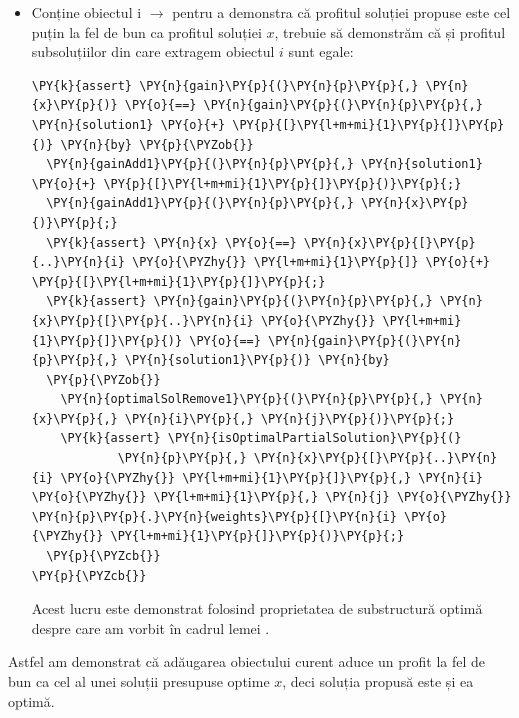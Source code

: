 \begin{sloppypar}
\begin{enumerate}
\begin{itemize}
\begin{Verbatim}[commandchars=\\\{\}]
\PY{n}{computeWeight}\PY{p}{(}\PY{n}{p}\PY{p}{,} \PY{n}{solution1} \PY{o}{+} \PY{p}{[}\PY{l+m+mi}{1}\PY{p}{]}\PY{p}{,} \PY{o}{|}\PY{n}{solution1} \PY{o}{+} \PY{p}{[}\PY{l+m+mi}{1}\PY{p}{]}\PY{o}{|} \PY{o}{\PYZhy{}} \PY{l+m+mi}{1}\PY{p}{)} \PY{o}{\PYZlt{}=} \PY{n}{j}
\end{Verbatim}
         că adăugând câștigul obiectului curent obținem un profit mai bun și nu depășim capacitatea $j$ ajungem la o contradicție, deci obiectul aparține soluției $x$.
         \item Conține obiectul i $\rightarrow$ pentru a demonstra că profitul soluției propuse este cel puțin la fel de bun ca profitul soluției $x$, trebuie să demonstrăm că și profitul subsoluțiilor din care extragem obiectul $i$ sunt egale:
         \begin{Verbatim}[commandchars=\\\{\}]
\PY{k}{assert} \PY{n}{gain}\PY{p}{(}\PY{n}{p}\PY{p}{,} \PY{n}{x}\PY{p}{)} \PY{o}{==} \PY{n}{gain}\PY{p}{(}\PY{n}{p}\PY{p}{,} \PY{n}{solution1} \PY{o}{+} \PY{p}{[}\PY{l+m+mi}{1}\PY{p}{]}\PY{p}{)} \PY{n}{by} \PY{p}{\PYZob{}} 
  \PY{n}{gainAdd1}\PY{p}{(}\PY{n}{p}\PY{p}{,} \PY{n}{solution1} \PY{o}{+} \PY{p}{[}\PY{l+m+mi}{1}\PY{p}{]}\PY{p}{)}\PY{p}{;}
  \PY{n}{gainAdd1}\PY{p}{(}\PY{n}{p}\PY{p}{,} \PY{n}{x}\PY{p}{)}\PY{p}{;}
  \PY{k}{assert} \PY{n}{x} \PY{o}{==} \PY{n}{x}\PY{p}{[}\PY{p}{..}\PY{n}{i} \PY{o}{\PYZhy{}} \PY{l+m+mi}{1}\PY{p}{]} \PY{o}{+} \PY{p}{[}\PY{l+m+mi}{1}\PY{p}{]}\PY{p}{;}
  \PY{k}{assert} \PY{n}{gain}\PY{p}{(}\PY{n}{p}\PY{p}{,} \PY{n}{x}\PY{p}{[}\PY{p}{..}\PY{n}{i} \PY{o}{\PYZhy{}} \PY{l+m+mi}{1}\PY{p}{]}\PY{p}{)} \PY{o}{==} \PY{n}{gain}\PY{p}{(}\PY{n}{p}\PY{p}{,} \PY{n}{solution1}\PY{p}{)} \PY{n}{by}
  \PY{p}{\PYZob{}}
    \PY{n}{optimalSolRemove1}\PY{p}{(}\PY{n}{p}\PY{p}{,} \PY{n}{x}\PY{p}{,} \PY{n}{i}\PY{p}{,} \PY{n}{j}\PY{p}{)}\PY{p}{;}
    \PY{k}{assert} \PY{n}{isOptimalPartialSolution}\PY{p}{(}
            \PY{n}{p}\PY{p}{,} \PY{n}{x}\PY{p}{[}\PY{p}{..}\PY{n}{i} \PY{o}{\PYZhy{}} \PY{l+m+mi}{1}\PY{p}{]}\PY{p}{,} \PY{n}{i} \PY{o}{\PYZhy{}} \PY{l+m+mi}{1}\PY{p}{,} \PY{n}{j} \PY{o}{\PYZhy{}} \PY{n}{p}\PY{p}{.}\PY{n}{weights}\PY{p}{[}\PY{n}{i} \PY{o}{\PYZhy{}} \PY{l+m+mi}{1}\PY{p}{]}\PY{p}{)}\PY{p}{;}
  \PY{p}{\PYZcb{}} 
\PY{p}{\PYZcb{}}
\end{Verbatim}
         Acest lucru este demonstrat folosind proprietatea de substructură optimă despre care am vorbit în cadrul lemei .
     \end{itemize}
     Astfel am demonstrat că adăugarea obiectului curent aduce un profit la fel de bun ca cel al unei soluții presupuse optime $x$, deci soluția propusă este și ea optimă.

\end{enumerate}
\end{sloppypar}
